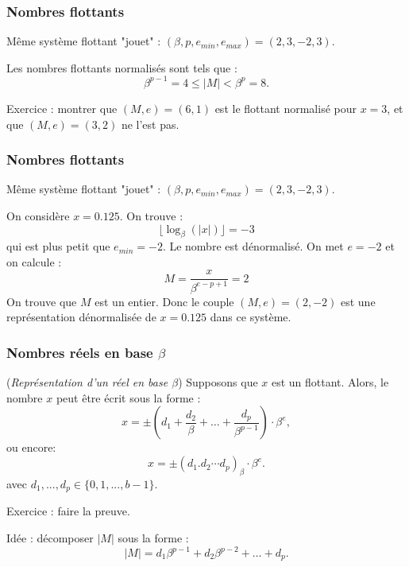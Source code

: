 \documentclass{beamer}
\begin{document}
\begin{frame}
\frametitle{Nombres flottants}

\begin{example}
Même système flottant "jouet" : $(\beta,p,e_{min},e_{max})=(2,3,-2,3)$.

Les nombres flottants normalisés sont tels que :
$$
\beta^{p-1}=4\leq |M| < \beta^p=8.
$$
\end{example}

Exercice : montrer que $(M,e)=(6,1)$ est le flottant normalisé pour $x=3$, 
et que $(M,e)=(3,2)$ ne l'est pas.

\end{frame}


\begin{frame}
\frametitle{Nombres flottants}

\begin{example}
Même système flottant "jouet" : $(\beta,p,e_{min},e_{max})=(2,3,-2,3)$.

On considère $x=0.125$. 
On trouve :
$$
\lfloor \log_\beta(|x|) \rfloor = -3
$$
qui est plus petit que $e_{min}=-2$. 
Le nombre est dénormalisé. 
On met $e=-2$ et on calcule :
$$
M = \frac{x}{\beta^{e-p+1}} = 2
$$
On trouve que $M$ est un entier. 
Donc le couple $(M,e)=(2,-2)$ est une représentation dénormalisée 
de $x=0.125$ dans ce système.
\end{example}

\end{frame}

\begin{frame}
\frametitle{Nombres réels en base $\beta$}

\begin{theorem}
(\emph{Représentation d'un réel en base $\beta$})
Supposons que $x$ est un flottant. 
Alors, le nombre $x$ peut être écrit sous la forme :
$$
x = \pm \left( 
d_1
+ \frac{d_2}{\beta} + \ldots 
+ \frac{d_p}{\beta^{p-1}} \right) \cdot \beta^e, 
$$
ou encore:
$$
x = \pm  (d_1 . d_2\cdots d_p)_\beta \cdot \beta^e.
$$
avec $d_1,...,d_p\in\{0,1,...,b-1\}$.
\end{theorem}

Exercice : faire la preuve.

Idée : décomposer $|M|$ sous la forme :
$$
|M|=d_1\beta^{p-1} + d_2\beta^{p-2} + \ldots + d_p.
$$

\end{frame}
\end{document}
